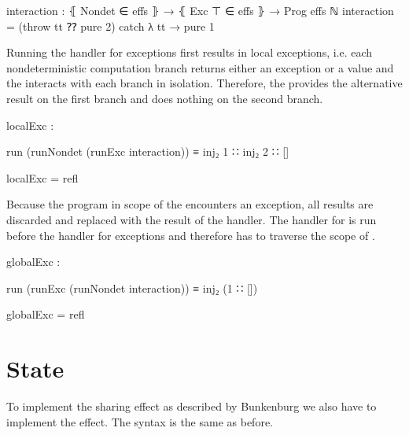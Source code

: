 \begin{code}
interaction : ⦃ Nondet ∈ effs ⦄ → ⦃ Exc ⊤ ∈ effs ⦄ → Prog effs ℕ
interaction = (throw tt ⁇ pure 2) catch λ tt → pure 1
\end{code}
Running the handler for exceptions first results in local exceptions, i.e. each
nondeterministic computation branch returns either an exception or a value and
the  interacts with each branch in isolation.
Therefore, the  provides the alternative result
 on the first branch and does nothing on the second branch.

\begin{center}
\begin{code}
localExc :
\end{code}
\begin{code}[inline]
 run (runNondet (runExc interaction)) ≡ inj₂ 1 ∷ inj₂ 2 ∷ []
\end{code}
\begin{code}
localExc = refl
\end{code}
\end{center}
Because the program in scope of the  encounters an
exception, all results are discarded and replaced with the result of the handler.
The handler for  is run before the handler for exceptions
and therefore has to traverse the scope of .

\begin{center}
\begin{code}
globalExc :
\end{code}
\begin{code}[inline]
 run (runExc (runNondet interaction)) ≡ inj₂ (1 ∷ [])
\end{code}
\begin{code}
globalExc = refl
\end{code}
\end{center}

\begin{code}
\end{code}

\section{State}
\label{scoped-algebra:state}

To implement the sharing effect as described by Bunkenburg we also have to
implement the  effect.
The syntax is the same as before.

